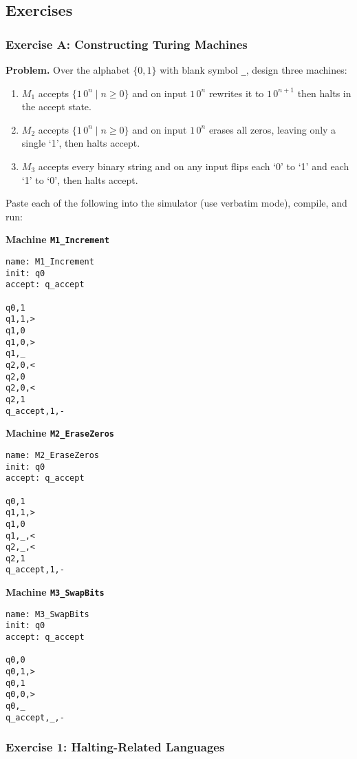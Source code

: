 \documentclass{article}
\theoremstyle{theorem}
\theoremstyle{definition}
\theoremstyle{remark}
\begin{document}
\subsection*{Exercises}

\subsubsection*{Exercise A: Constructing Turing Machines}

\textbf{Problem.}  Over the alphabet \(\{0,1\}\) with blank symbol \texttt{\_}, design three machines:

\begin{enumerate}
  \item \(M_{1}\) accepts \(\{1\,0^n\mid n\ge0\}\) and on input \(1\,0^n\) rewrites it to \(1\,0^{n+1}\) then halts in the accept state.
  \item \(M_{2}\) accepts \(\{1\,0^n\mid n\ge0\}\) and on input \(1\,0^n\) erases all zeros, leaving only a single `1', then halts accept.
  \item \(M_{3}\) accepts every binary string and on any input flips each `0' to `1' and each `1' to `0', then halts accept.
\end{enumerate}

Paste each of the following into the simulator (use verbatim mode), compile, and run:

\bigskip
\noindent\textbf{Machine \texttt{M1\_Increment}}  
\begin{verbatim}
name: M1_Increment
init: q0
accept: q_accept

q0,1
q1,1,>
q1,0
q1,0,>
q1,_
q2,0,<
q2,0
q2,0,<
q2,1
q_accept,1,-
\end{verbatim}

\newpage

\bigskip
\noindent\textbf{Machine \texttt{M2\_EraseZeros}}  
\begin{verbatim}
name: M2_EraseZeros
init: q0
accept: q_accept

q0,1
q1,1,>
q1,0
q1,_,<
q2,_,<
q2,1
q_accept,1,-
\end{verbatim}

\bigskip
\noindent\textbf{Machine \texttt{M3\_SwapBits}}  
\begin{verbatim}
name: M3_SwapBits
init: q0
accept: q_accept

q0,0
q0,1,>
q0,1
q0,0,>
q0,_
q_accept,_,-
\end{verbatim}

\bigskip
\subsubsection*{Exercise 1: Halting-Related Languages}
\end{document}
